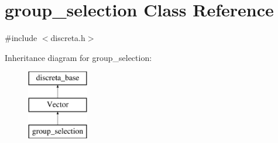 \hypertarget{classgroup__selection}{}\section{group\+\_\+selection Class Reference}
\label{classgroup__selection}


{\ttfamily \#include $<$discreta.\+h$>$}

Inheritance diagram for group\+\_\+selection\+:\begin{figure}[H]
\begin{center}
\leavevmode
\includegraphics[height=3.000000cm]{classgroup__selection}
\end{center}
\end{figure}
